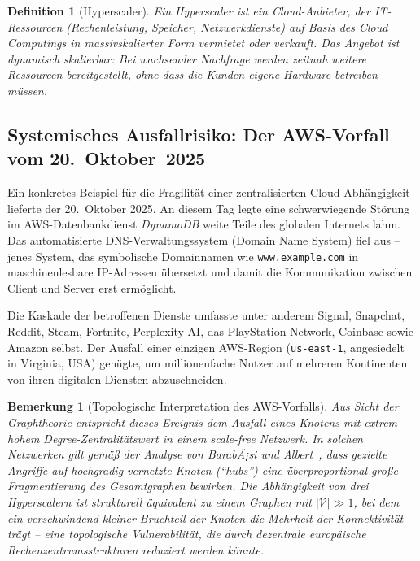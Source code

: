 ﻿\documentclass[12pt, a4paper, openany]{report}
\newtheorem{definition}[theorem]{Definition}
\newtheorem{remark}[theorem]{Bemerkung}
\newcommand{\calV}{\mathcal{V}}
\begin{document}
\begin{definition}[Hyperscaler]
	\label{def:hyperscaler}
	Ein \emph{Hyperscaler} ist ein Cloud-Anbieter, der IT-Ressourcen
	(Rechenleistung, Speicher, Netzwerkdienste) auf Basis des Cloud
	Computings in massivskalierter Form vermietet oder verkauft. Das Angebot
	ist dynamisch skalierbar: Bei wachsender Nachfrage werden zeitnah weitere
	Ressourcen bereitgestellt, ohne dass die Kunden eigene Hardware betreiben
	müssen.
\end{definition}

\subsection{Systemisches Ausfallrisiko: Der AWS-Vorfall vom 20.~Oktober~2025}

Ein konkretes Beispiel für die Fragilität einer zentralisierten Cloud-Abhängigkeit
lieferte der 20.~Oktober 2025. An diesem Tag legte eine schwerwiegende Störung
im AWS-Datenbankdienst \textit{DynamoDB} weite Teile des globalen Internets
lahm. Das automatisierte DNS-Verwaltungssystem (Domain Name System) fiel aus --
jenes System, das symbolische Domainnamen wie \texttt{www.example.com} in
maschinenlesbare IP-Adressen übersetzt und damit die Kommunikation zwischen
Client und Server erst ermöglicht.

Die Kaskade der betroffenen Dienste umfasste unter anderem Signal, Snapchat,
Reddit, Steam, Fortnite, Perplexity AI, das PlayStation Network, Coinbase sowie
Amazon selbst. Der Ausfall einer einzigen AWS-Region (\texttt{us-east-1},
angesiedelt in Virginia, USA) genügte, um millionenfache Nutzer auf mehreren
Kontinenten von ihren digitalen Diensten abzuschneiden.

\begin{remark}[Topologische Interpretation des AWS-Vorfalls]
	\label{rem:aws_topologie}
	Aus Sicht der Graphtheorie entspricht dieses Ereignis dem Ausfall eines
	Knotens mit extrem hohem Degree-Zentralitätswert in einem scale-free
	Netzwerk. In solchen Netzwerken gilt gemäß der Analyse von BarabÃ¡si und
	Albert~\cite{barabasi99}, dass gezielte Angriffe auf hochgradig vernetzte
	Knoten (``hubs'') eine überproportional große Fragmentierung des Gesamtgraphen
	bewirken. Die Abhängigkeit von drei Hyperscalern ist strukturell äquivalent
	zu einem Graphen mit $|\calV| \gg 1$, bei dem ein verschwindend kleiner
	Bruchteil der Knoten die Mehrheit der Konnektivität trägt -- eine
	topologische Vulnerabilität, die durch dezentrale europäische
	Rechenzentrumsstrukturen reduziert werden könnte.
\end{remark}
\end{document}

